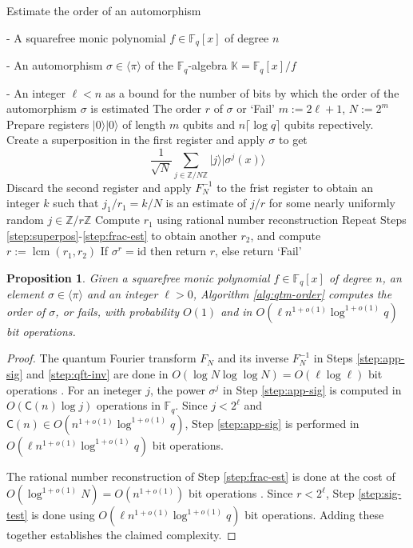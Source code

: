 \documentclass{article}
\theoremstyle{plain}
\newtheorem{proposition}[theorem]{Proposition}
\theoremstyle{definition}
\newcommand{\algbox}[1]{
	\begin{tcolorbox}[width = 0.8\textwidth, colback = white, arc = 2pt, boxrule = 0.5pt] 
		#1 
	\end{tcolorbox}
}
\newcommand{\lrang}[1]{\langle#1\rangle}
\newcommand{\ldbrac}[1]{\lvert#1\rangle}
\DeclareMathOperator{\lcm}{lcm} %
\def\K{\ensuremath{\mathbb{K}}}
\def\Z{\ensuremath{\mathbb{Z}}}
\def\F{\ensuremath{\mathbb{F}}}
\def\CC{\ensuremath{\mathsf{C}}}
\begin{document}
\begin{algorithm}[t]
	\caption{Estimate the order of an automorphism}
	\label{alg:qtm-order}
	\centering
	\algbox{
	\begin{algorithmic}[1]
		\Require 
		\item[-] A squarefree monic polynomial $f \in \F_q[x]$ of degree $n$
		\item[-] An automorphism $\sigma \in \lrang{\pi}$ of the $\F_q$-algebra $\K = \F_q[x] / f$
		\item[-] An integer $\ell < n$ as a bound for the number of bits by which the order of the 
		automorphism $\sigma$ is estimated
		\Ensure The order $r$ of $\sigma$ or `Fail'
		\State $m := 2\ell + 1$, $N := 2^m$
		\State\label{step:superpos}Prepare registers $\ldbrac{0}\ldbrac{0}$ of length $m$ qubits 
		and $n\lceil \log q \rceil$ qubits repectively.
		\State\label{step:app-sig}Create a superposition in the first register and apply $\sigma$ 
		to get
		\[ \frac{1}{\sqrt{N}} \sum_{j \in \Z/N\Z} \ldbrac{j}\ldbrac{\sigma^j(x)} \]
		\State\label{step:qft-inv}Discard the second register and apply $F_N^{-1}$ to the frist 
		register to obtain an integer $k$ such that $j_1 / r_1 = k / N$ is an estimate of $j / r$ 
		for some nearly uniformly random $j \in \Z/r\Z$
		\State\label{step:frac-est}Compute $r_1$ using rational number reconstruction
		\State Repeat Steps \ref{step:superpos}-\ref{step:frac-est} to obtain another $r_2$, 
		and compute $r := \lcm(r_1, r_2)$
		\State\label{step:sig-test} If $\sigma^r = \text{id}$ then return $r$, else return `Fail'
	\end{algorithmic}}
\end{algorithm}

\begin{proposition}
	Given a squarefree monic polynomial $f \in \F_q[x]$ of degree $n$, an element $\sigma \in 
	\lrang{\pi}$ and an integer $\ell > 0$, Algorithm \ref{alg:qtm-order} computes the order of 
	$\sigma$, or fails, with probability $O(1)$ and in $O(\ell n^{1 + o(1)}\log^{1 + o(1)}q)$ bit 
	operations.
\end{proposition}
\begin{proof}
	The quantum Fourier transform $F_N$ and its inverse $F_N^{-1}$ in Steps \ref{step:app-sig} 
	and \ref{step:qft-inv} are done in $O(\log N \log\log N) = O(\ell\log\ell)$ bit operations 
	\cite{cleve1998quantum, childs2010quantum}. For an ineteger $j$, the power $\sigma^j$ in Step 
	\ref{step:app-sig} is computed in $O(\CC(n)\log j)$ operations in $\F_q$. Since $j < 2^\ell$ 
	and $\CC(n) \in O(n^{1 + o(1)}\log^{1 + o(1)}q)$, Step \ref{step:app-sig} is performed in 
	$O(\ell n^{1 + o(1)}\log^{1 + o(1)}q)$ bit operations.
	
	The rational number reconstruction of Step \ref{step:frac-est} is done at the cost of 
	$O(\log^{1 + o(1)}N) = O(n^{1 + o(1)})$ bit operations \cite{pan2002acceleration}. Since $r < 
	2^\ell$, Step \ref{step:sig-test} is done using $O(\ell n^{1 + o(1)}\log^{1 + o(1)}q)$ bit 
	operations. Adding these together establishes the claimed complexity.
\end{proof}
\end{document}
